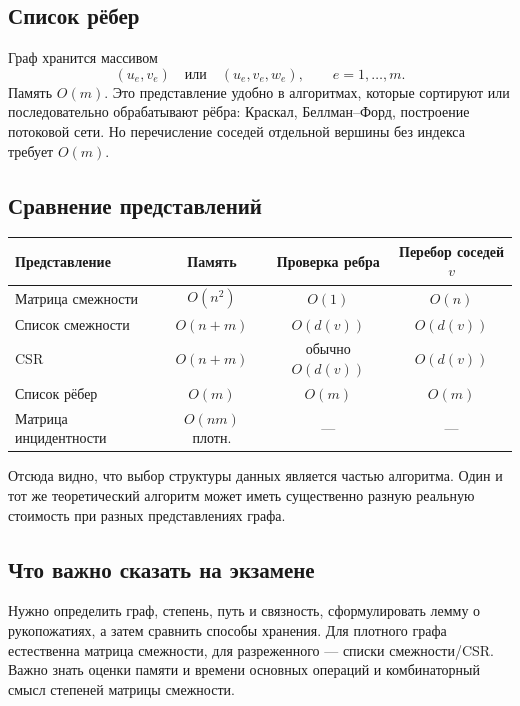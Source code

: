\subsection{Список рёбер}

Граф хранится массивом
\[
 (u_e,v_e)
\quad\text{или}\quad
 (u_e,v_e,w_e),\qquad e=1,\ldots,m.
\]
Память $O(m)$. Это представление удобно в алгоритмах, которые сортируют или
последовательно обрабатывают рёбра: Краскал, Беллман--Форд, построение потоковой
сети. Но перечисление соседей отдельной вершины без индекса требует $O(m)$.

\subsection{Сравнение представлений}

\begin{center}
\renewcommand{\arraystretch}{1.2}
\begin{tabular}{|l|c|c|c|}
\hline
Представление & Память & Проверка ребра & Перебор соседей $v$\\ \hline
Матрица смежности & $O(n^2)$ & $O(1)$ & $O(n)$\\ \hline
Список смежности & $O(n+m)$ & $O(d(v))$ & $O(d(v))$\\ \hline
CSR & $O(n+m)$ & обычно $O(d(v))$ & $O(d(v))$\\ \hline
Список рёбер & $O(m)$ & $O(m)$ & $O(m)$\\ \hline
Матрица инцидентности & $O(nm)$ плотн. & --- & ---\\ \hline
\end{tabular}
\end{center}

Отсюда видно, что выбор структуры данных является частью алгоритма. Один и тот же
теоретический алгоритм может иметь существенно разную реальную стоимость при
разных представлениях графа.

\subsection{Что важно сказать на экзамене}

Нужно определить граф, степень, путь и связность, сформулировать лемму о
рукопожатиях, а затем сравнить способы хранения. Для плотного графа естественна
матрица смежности, для разреженного --- списки смежности/CSR. Важно знать оценки
памяти и времени основных операций и комбинаторный смысл степеней матрицы
смежности.

\newpage
